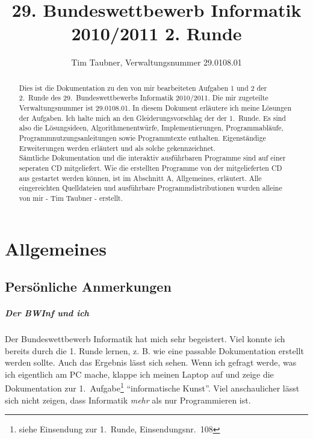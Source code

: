 \documentclass[a4paper,10pt,notitlepage]{scrreprt}
\title{29. Bundeswettbewerb Informatik 2010/2011 2. Runde}
\author{Tim Taubner, Verwaltungsnummer 29.0108.01}
\makeatletter
\renewcommand{\thechapter}{\Alph{chapter}}
\newcommand{\nobreakchap}{%
  \renewcommand\chapter{\section}
}
\newcommand{\normalchap}{%
  \renewcommand\chapter{%
  \if@openright\cleardoublepage\else\clearpage\fi
  \thispagestyle{\chapterpagestyle}%
  \global\@topnum\z@
  \@afterindentfalse
  \secdef\@chapter\@schapter}
}
\makeatother
\begin{document}
\begin{titlepage}
  \begin{samepage}
  \maketitle
  \vfill
  \begin{abstract}
   Dies ist die Dokumentation zu den von mir bearbeiteten Aufgaben 1 und 2 der 2.\ Runde des 29.\ Bundeswettbewerbs Informatik 2010/2011.
   Die mir zugeteilte Verwaltungsnummer ist 29.0108.01.
   In diesem Dokument erläutere ich meine Lösungen der Aufgaben.
   Ich halte mich an den Gleiderungsvorschlag der der 1.\ Runde.
   Es sind also die Lösungsideen, Algorithmenentwürfe, Implementierungen, Programmabläufe, Programmnutzungsanleitungen sowie Programmtexte enthalten.
   Eigenständige Erweiterungen werden erläutert und als solche gekennzeichnet.\\

   Sämtliche Dokumentation und die interaktiv ausführbaren Programme sind auf einer seperaten CD mitgeliefert.
   Wie die erstellten Programme von der mitgelieferten CD aus gestartet werden können, ist im Abschnitt A, Allgemeines, erläutert.
   Alle eingereichten Quelldateien und ausführbare Programmdistributionen wurden alleine von mir - Tim Taubner - erstellt.
  \end{abstract}
  \vfill
  \setcounter{tocdepth}{0}
  \setcounter{minitocdepth}{3}
  \dominitoc
\renewcommand{\contentsname}{Inhaltsübersicht}
  \nobreakchap
  \tableofcontents
  \vfill
  \normalchap
  \end{samepage}
\end{titlepage}

\renewcommand*\mtctitle{\bfseries\Large Inhalt der Aufgabendokumentation}
\nomtcrule

\chapter{Allgemeines}
\fancyhead[L]{\thechapter. Allgemeines}

\section{Persönliche Anmerkungen} %
\paragraph{Der BWInf und ich}
 Der Bundeswettbewerb Informatik hat mich sehr begeistert.
 Viel konnte ich bereits durch die 1. Runde lernen, z. B. wie eine passable Dokumentation erstellt werden sollte.
 Auch das Ergebnis lässt sich sehen. Wenn ich gefragt werde, was ich eigentlich am PC mache,
 klappe ich meinen Laptop auf und zeige die Dokumentation zur 1.\ Aufgabe\footnote{siehe Einsendung zur 1.\ Runde, Einsendungsnr.\ 108}  ``informatische Kunst''.
 Viel anschaulicher lässt sich nicht zeigen, dass Informatik \emph{mehr} als nur Programmieren ist.
\end{document}
